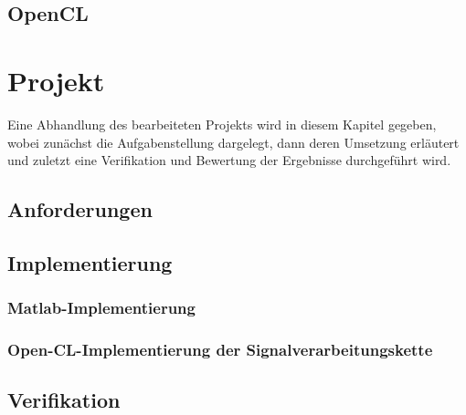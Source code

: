 \documentclass[a4paper,12pt,oneside,german,toc=bibliography]{scrbook}
\theoremstyle{definition}
\theoremstyle{plain}
\numberwithin{equation}{section}
\begin{document}





\section{OpenCL}






\chapter{Projekt}
\label{chap:Projekt}

Eine Abhandlung des bearbeiteten Projekts wird in diesem Kapitel gegeben,
wobei zunächst die Aufgabenstellung dargelegt, dann deren Umsetzung erläutert und zuletzt eine Verifikation und Bewertung der Ergebnisse durchgeführt wird.

\section{Anforderungen}


\section{Implementierung}

\subsection{Matlab-Implementierung}
\subsection{Open-CL-Implementierung der Signalverarbeitungskette}


\section{Verifikation}
\end{document}
